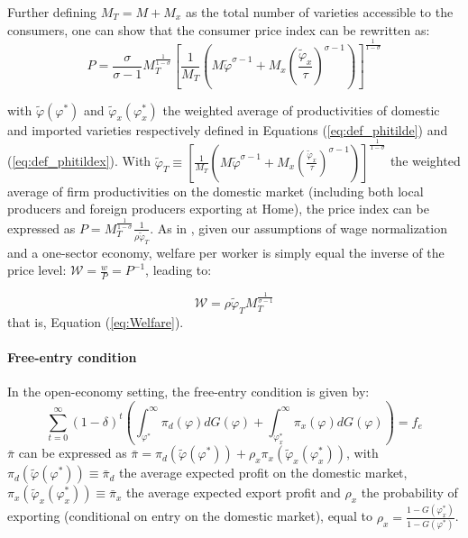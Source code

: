 \documentclass[a4paper,11pt]{article}
\begin{document}
Further defining $M_T = M+M_x$ as the total number of varieties accessible to the consumers, one can show that the consumer price index can be rewritten as:
$$P = \frac{\sigma}{\sigma-1}M_T^{\frac{1}{1-\sigma}}\left[\frac{1}{M_T}\left(M\widetilde{\varphi}^{\sigma-1} + M_x \left( \frac{\widetilde{\varphi}_x}{\tau} \right)^{\sigma-1} \right)  \right]^{\frac{1}{1-\sigma}}$$

\noindent with $\widetilde{\varphi}(\varphi^\ast)$ and $\widetilde{\varphi}_x(\varphi_x^\ast)$ the weighted average of productivities of domestic and imported varieties respectively defined in Equations (\ref{eq:def_phitilde}) and (\ref{eq:def_phitildex}). With $\widetilde{\varphi}_T \equiv \left[\frac{1}{M_T}\left(M\widetilde{\varphi}^{\sigma-1} + M_x \left( \frac{\widetilde{\varphi}_x}{\tau} \right)^{\sigma-1} \right)  \right]^{\frac{1}{1-\sigma}}$ the weighted average of firm productivities on the domestic market (including both local producers and foreign producers exporting at Home), the price index can be expressed as $P = M_T^{\frac{1}{1-\sigma}}\frac{1}{\rho \widetilde{\varphi}_T }$. As in \cite{melitz}, given our assumptions of wage normalization and a one-sector economy, welfare per worker is simply equal the inverse of the price level: $\mathcal{W} = \frac{w}{P}= P^{-1}$, leading to:

\begin{equation*}
\mathcal{W} = \rho \widetilde{\varphi}_T M_T^{\frac{1}{\sigma-1}}
\end{equation*}
\noindent that is, Equation (\ref{eq:Welfare}).

\paragraph{Free-entry condition} In the open-economy setting, the free-entry condition is given by:
\begin{equation*}
  \sum_{t=0}^{\infty}(1-\delta)^t \left(\int_{\varphi^\ast}^{\infty} \pi_d(\varphi )dG(\varphi) + \int_{\varphi_x^\ast}^{\infty} \pi_x(\varphi )dG(\varphi)  \right) = f_e
\end{equation*}
$\bar{\pi}$ can be expressed as $\bar{\pi} =\pi_d(\widetilde{\varphi}(\varphi^\ast)) + \rho_x \pi_x(\widetilde{\varphi}_x(\varphi_x^\ast))$, with $\pi_d(\widetilde{\varphi}(\varphi^\ast)) \equiv \bar{\pi}_d$ the average expected profit on the domestic market, $\pi_x(\widetilde{\varphi}_x(\varphi_x^\ast))\equiv \bar{\pi}_x$ the average expected export profit and $\rho_x$ the probability of exporting (conditional on entry on the domestic market), equal to $\rho_x = \frac{1-G(\varphi_x^\ast)}{1-G(\varphi^\ast)}$.
\end{document}
